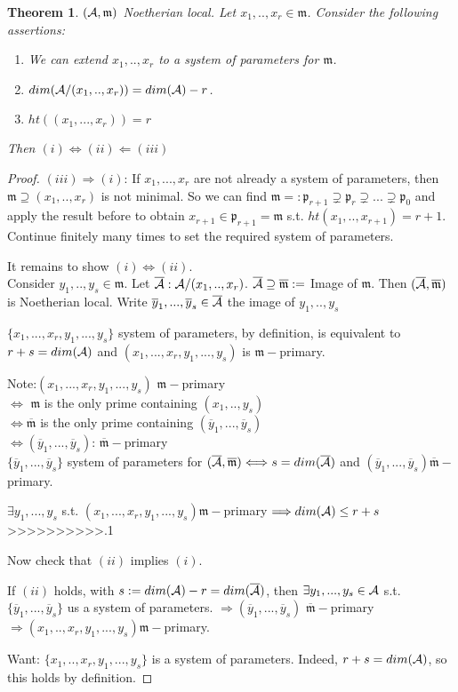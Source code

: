 \documentclass[11pt]{article}
\newtheorem{thm}{Theorem}[section]
\newcommand{\scm}{{\mathfrak m}}
\newcommand{\scp}{{\mathfrak p}}
\newcommand{\cala}{{\cal A}}
\newcommand{\Lrta}{\Longrightarrow}
\newcommand{\Llta}{\Longleftarrow}
\newcommand{\Llrta}{\Longleftrightarrow}
\begin{document}
\begin{thm}
$(\cala,\scm)$ Noetherian local. Let $x_1,..,x_r\in\scm$. Consider the following assertions:
\begin{enumerate}[label=(\roman*)]
\item We can extend $x_1,..,x_r$ to a system of parameters for $\scm$.
\item $dim(\cala/(x_1,..,x_r))=dim(\cala)-r$.
\item $ht((x_1,...,x_r))=r$
\end{enumerate}
Then $(i)\Llrta(ii)\Llta(iii)$
\end{thm}
\begin{proof}
$(iii)\Lrta(i)$: If $x_1,...,x_r$ are not already a system of parameters, then $\scm\supseteq(x_1,..,x_r)$ is not minimal. So we can find $\scm=:\scp_{r+1}\supsetneq \scp_r\supsetneq ...\supsetneq \scp_0$ and apply the result before to obtain $x_{r+1}\in\scp_{r+1}=\scm$ s.t. $ht(x_1,..,x_{r+1})=r+1$. Continue finitely many times to set the required system of parameters.

It remains to show $(i)\Llrta (ii)$. \\
Consider $y_1,..,y_s\in\scm$. Let $\overline{\cala}:\cala/(x_1,..,x_r)$. $\overline{\cala}\supseteq\overline{\scm}:=$ Image  of $\scm$. Then $(\overline{\cala},\overline{\scm})$ is Noetherian local. Write $\overline{y}_1,...,\overline{y}_s\in\overline{\cala}$ the image of $y_1,..,y_s$

$\{x_1,...,x_r,y_1,...,y_s\}$ system of parameters, by definition, is equivalent to $r+s=dim(\cala)$ and $(x_1,...,x_r,y_1,...,y_s)$ is $\scm-$primary.

Note:$(x_1,...,x_r,y_1,...,y_s)$ $\scm-$primary\\
$\Llrta$ $\scm$ is the only prime containing $(x_1,..,y_s)$\\
$\Llrta\overline{\scm}$ is the only prime containing $(\overline{y}_1,...,\overline{y}_s)$\\
$\Llrta(\overline{y}_1,...,\overline{y}_s)$: $\overline{\scm}-$primary\\
$\{\overline{y}_1,...,\overline{y}_s\}$ system of parameters for $(\overline{\cala},\overline{\scm})\Llrta s=dim(\overline{\cala})$ and $(\overline{y}_1,...,\overline{y}_s)\overline{\scm}-$primary.

$\exists y_1,...,y_s$ s.t. $(x_1,...,x_r,y_1,...,y_s)\scm-$primary $\Lrta dim(\cala)\leq r+s$
>>>>>>>>>>.1


Now check that $(ii)$ implies $(i)$.

If $(ii)$ holds, with $s:=dim(\cala)-r=dim(\overline{\cala})$, then $\exists y_1,...,y_s\in\cala$ s.t. $\{\overline{y}_1,...,\overline{y}_s\}$ us a system of parameters. $\Lrta(\overline{y}_1,...,\overline{y}_s)$ $\overline{\scm}-$primary $\Lrta (x_1,..,x_r,y_1,...,y_s)\scm-$primary.

Want: $\{x_1,..,x_r,y_1,...,y_s\}$ is a system of parameters. Indeed, $r+s=dim(\cala)$, so this holds by definition. 
\end{proof}
\end{document}

